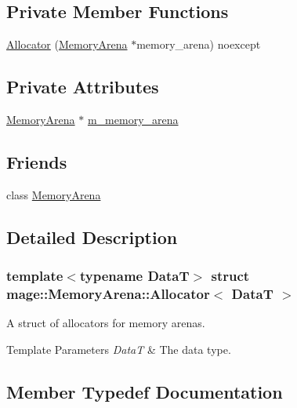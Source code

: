 \subsection*{Private Member Functions}
\begin{DoxyCompactItemize}
\item 
\hyperlink{structmage_1_1_memory_arena_1_1_allocator_a10a6ea82aab121d4e04efa004a49910b}{Allocator} (\hyperlink{classmage_1_1_memory_arena}{Memory\+Arena} $\ast$memory\+\_\+arena) noexcept
\end{DoxyCompactItemize}
\subsection*{Private Attributes}
\begin{DoxyCompactItemize}
\item 
\hyperlink{classmage_1_1_memory_arena}{Memory\+Arena} $\ast$ \hyperlink{structmage_1_1_memory_arena_1_1_allocator_aedfb429d9e7a6b59d9706183963c37ee}{m\+\_\+memory\+\_\+arena}
\end{DoxyCompactItemize}
\subsection*{Friends}
\begin{DoxyCompactItemize}
\item 
class \hyperlink{structmage_1_1_memory_arena_1_1_allocator_a934e79307a45b6e72da26d1f10079550}{Memory\+Arena}
\end{DoxyCompactItemize}


\subsection{Detailed Description}
\subsubsection*{template$<$typename DataT$>$\newline
struct mage\+::\+Memory\+Arena\+::\+Allocator$<$ Data\+T $>$}

A struct of allocators for memory arenas.


\begin{DoxyTemplParams}{Template Parameters}
{\em DataT} & The data type. \\
\hline
\end{DoxyTemplParams}


\subsection{Member Typedef Documentation}
\hypertarget{structmage_1_1_memory_arena_1_1_allocator_aa03d66542fcf507199911bca8b270bfc}{}\label{structmage_1_1_memory_arena_1_1_allocator_aa03d66542fcf507199911bca8b270bfc} 
